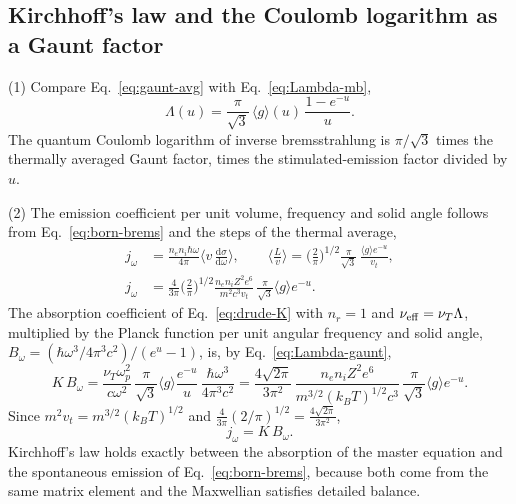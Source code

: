 \documentclass[11pt]{article}
\numberwithin{equation}{section}
\newcommand{\nuT}{\nu_T}
\newcommand{\nueff}{\nu_{\rm eff}}
\newcommand{\dd}{\mathrm d}
\newcommand{\kB}{k_B}
\begin{document}
\subsection{Kirchhoff's law and the Coulomb logarithm as a Gaunt factor}
{\noindent}(1) Compare Eq.~\eqref{eq:gaunt-avg} with Eq.~\eqref{eq:Lambda-mb},
\begin{equation}
\boxed{\;\Lambda(u)=\frac{\pi}{\sqrt3}\,\langle g\rangle(u)\,\frac{1-e^{-u}}{u}.\;}
\label{eq:Lambda-gaunt}
\end{equation}
The quantum Coulomb logarithm of inverse bremsstrahlung is $\pi/\sqrt3$ times
the thermally averaged Gaunt factor, times the stimulated-emission factor
divided by $u$.

{\noindent}(2) The emission coefficient per unit volume, frequency and solid
angle follows from Eq.~\eqref{eq:born-brems} and the steps of the thermal
average,
\begin{equation}
\begin{aligned}
j_\omega&=\frac{n_en_i\hbar\omega}{4\pi}\Big\langle v\,\frac{\dd\sigma}{\dd\omega}\Big\rangle,\qquad
\Big\langle\frac Lv\Big\rangle=\Big(\frac2\pi\Big)^{1/2}\frac{\pi}{\sqrt3}\,\frac{\langle g\rangle e^{-u}}{v_t},\\
j_\omega&=\frac{4}{3\pi}\Big(\frac2\pi\Big)^{1/2}\frac{n_en_iZ^2e^6}{m^2c^3v_t}\,\frac{\pi}{\sqrt3}\langle g\rangle e^{-u}.
\end{aligned}
\end{equation}
The absorption coefficient of Eq.~\eqref{eq:drude-K} with $n_r=1$ and
$\nueff=\nuT\Lambda$, multiplied by the Planck function per unit angular
frequency and solid angle, $B_\omega=(\hbar\omega^3/4\pi^3c^2)/(e^u-1)$, is, by
Eq.~\eqref{eq:Lambda-gaunt},
\begin{equation}
K\,B_\omega=\frac{\nuT\omega_p^2}{c\omega^2}\,\frac{\pi}{\sqrt3}\langle g\rangle\frac{e^{-u}}{u}\,\frac{\hbar\omega^3}{4\pi^3c^2}
=\frac{4\sqrt{2\pi}}{3\pi^2}\,\frac{n_en_iZ^2e^6}{m^{3/2}(\kB T)^{1/2}c^3}\,\frac{\pi}{\sqrt3}\langle g\rangle e^{-u}.
\end{equation}
Since $m^2v_t=m^{3/2}(\kB T)^{1/2}$ and $\tfrac{4}{3\pi}(2/\pi)^{1/2}=\tfrac{4\sqrt{2\pi}}{3\pi^2}$,
\begin{equation}
\boxed{\;j_\omega=K\,B_\omega.\;}
\label{eq:kirchhoff}
\end{equation}
Kirchhoff's law holds exactly between the absorption of the master equation
and the spontaneous emission of Eq.~\eqref{eq:born-brems}, because both come
from the same matrix element and the Maxwellian satisfies detailed balance.
\end{document}
